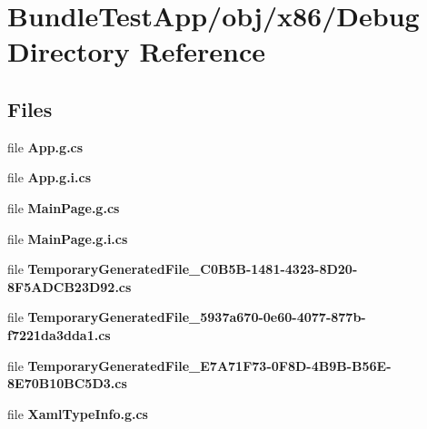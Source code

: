 \section{Bundle\+Test\+App/obj/x86/\+Debug Directory Reference}
\label{dir_cc5fff42ff5bbd72f3fbe99333a68421}
\subsection*{Files}
\begin{DoxyCompactItemize}
\item 
file {\bfseries App.\+g.\+cs}
\item 
file {\bfseries App.\+g.\+i.\+cs}
\item 
file {\bfseries Main\+Page.\+g.\+cs}
\item 
file {\bfseries Main\+Page.\+g.\+i.\+cs}
\item 
file {\bfseries Temporary\+Generated\+File\+\_\+C0\+B5\+B-\/1481-\/4323-\/8\+D20-\/8\+F5\+A\+D\+C\+B23\+D92.\+cs}
\item 
file {\bfseries Temporary\+Generated\+File\+\_\+5937a670-\/0e60-\/4077-\/877b-\/f7221da3dda1.\+cs}
\item 
file {\bfseries Temporary\+Generated\+File\+\_\+\+E7\+A71\+F73-\/0\+F8\+D-\/4\+B9\+B-\/\+B56\+E-\/8\+E70\+B10\+B\+C5\+D3.\+cs}
\item 
file {\bfseries Xaml\+Type\+Info.\+g.\+cs}
\end{DoxyCompactItemize}
